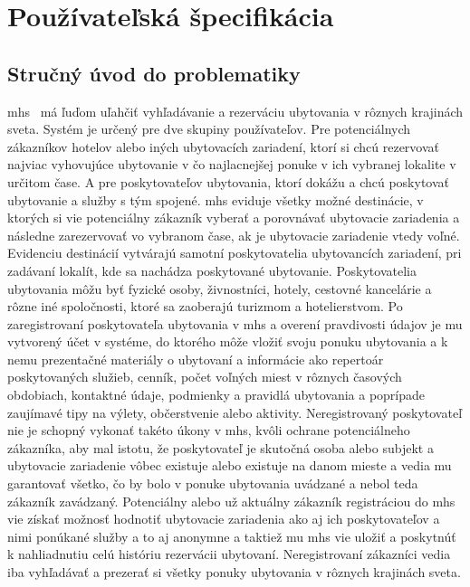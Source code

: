 \section{Používateľská špecifikácia} %
\subsection{Stručný úvod do problematiky}

\acrfull{mhs} \projectName\ má ľuďom uľahčiť vyhľadávanie a rezerváciu 
ubytovania v rôznych krajinách sveta.
Systém je určený pre dve skupiny používateľov. 
Pre potenciálnych zákazníkov hotelov alebo iných ubytovacích zariadení, 
ktorí si chcú rezervovať najviac vyhovujúce ubytovanie v čo najlacnejšej 
ponuke v ich vybranej lokalite v určitom čase. 
A pre poskytovateľov ubytovania, ktorí dokážu a chcú poskytovať ubytovanie 
a služby s tým spojené. 
\acrshort{mhs} eviduje všetky možné destinácie, v ktorých si vie 
potenciálny zákazník vyberať a porovnávať ubytovacie zariadenia a následne 
zarezervovať vo vybranom čase, ak je ubytovacie zariadenie vtedy voľné. 
Evidenciu destinácií vytvárajú samotní poskytovatelia ubytovancích zariadení, 
pri zadávaní lokalít, kde sa nachádza poskytované ubytovanie. 
Poskytovatelia ubytovania môžu byť fyzické osoby, živnostníci, hotely, 
cestovné kancelárie a rôzne iné spoločnosti, ktoré sa zaoberajú turizmom 
a hotelierstvom. 
Po zaregistrovaní poskytovateľa ubytovania v \acrshort{mhs} a overení 
pravdivosti údajov je mu vytvorený účet v systéme, do ktorého môže vložiť 
svoju ponuku ubytovania a k nemu prezentačné materiály o ubytovaní a 
informácie ako repertoár poskytovaných služieb, cenník, počet voľných 
miest v rôznych časových obdobiach, kontaktné údaje, podmienky a 
pravidlá ubytovania a poprípade zaujímavé tipy na výlety, občerstvenie 
alebo aktivity. Neregistrovaný poskytovateľ nie je schopný vykonať takéto 
úkony v \acrshort{mhs}, kvôli ochrane potenciálneho zákazníka, aby mal 
istotu, že poskytovateľ je skutočná osoba alebo subjekt a ubytovacie 
zariadenie vôbec existuje alebo existuje na danom mieste a vedia mu 
garantovať všetko, čo by bolo v ponuke ubytovania uvádzané a nebol teda 
zákazník zavádzaný. Potenciálny alebo už aktuálny zákazník registráciou 
do \acrshort{mhs} vie získať možnosť hodnotiť ubytovacie zariadenia ako 
aj ich poskytovateľov a nimi ponúkané služby a to aj anonymne a taktiež 
mu \acrshort{mhs} vie uložiť a poskytnúť k nahliadnutiu celú históriu 
rezervácii ubytovaní. Neregistrovaní zákazníci vedia iba vyhľadávať a 
prezerať si všetky ponuky ubytovania v rôznych krajinách sveta.
